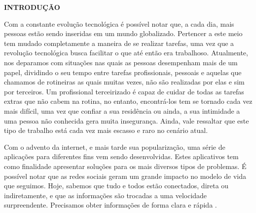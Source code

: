 \begin{center}
	\vspace{1.2em}
	\textbf{\large INTRODUÇÃO}
	\vspace{2.9em}
\end{center}
\thispagestyle{empty}


\par Com a constante evolução tecnológica é possível notar que, a cada dia, mais pessoas estão sendo inseridas em um mundo globalizado. Pertencer a este meio tem mudado completamente a maneira de se realizar tarefas, uma vez que a revolução tecnológica busca facilitar o que até então era trabalhoso. Atualmente, nos deparamos com situações nas quais as pessoas desempenham mais de um papel, dividindo o seu tempo entre tarefas profissionais, pessoais e aquelas que chamamos de rotineiras as quais muitas vezes, não são realizadas por elas e sim por terceiros. %
Um profissional terceirizado é capaz de cuidar de todas as tarefas extras que não cabem na rotina, no entanto, encontrá-los tem se tornado cada vez mais difícil, uma vez que confiar a sua residência ou ainda, a sua intimidade a uma pessoa não conhecida gera muita insegurança. Ainda, vale ressaltar que este tipo de trabalho está cada vez mais escasso e raro no cenário atual.

\par Com o advento da internet, e mais tarde sua popularização, uma série de aplicações para diferentes fins vem sendo desenvolvidas. Estes aplicativos tem como finalidade apresentar soluções para os mais diversos tipos de problemas. É possível notar que as redes sociais geram um grande impacto no modelo de vida que seguimos. Hoje, sabemos que tudo e todos estão conectados, direta ou indiretamente, e que as informações são trocadas a uma velocidade surpreendente. Precisamos obter informações de forma clara e rápida \cite{barbosa_why_people_use_social_network}.

